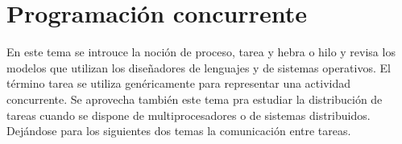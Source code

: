 \section{Programación concurrente}

En este tema se introuce la noción de proceso, tarea y hebra o hilo y revisa los
modelos que utilizan los diseñadores de lenguajes y de sistemas operativos. El
término tarea se utiliza genéricamente para representar una actividad
concurrente. Se aprovecha también este tema pra estudiar la distribución de
tareas cuando se dispone de multiprocesadores o de sistemas distribuidos.
Dejándose para los siguientes dos temas la comunicación entre tareas.
